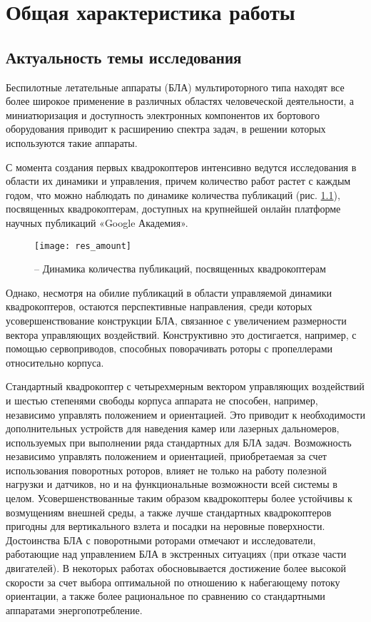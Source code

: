 
\chapter{Общая характеристика работы}

\section{Актуальность темы исследования}

Беспилотные летательные аппараты (БЛА) мультироторного типа находят все более широкое применение в различных областях человеческой деятельности, а миниатюризация и доступность электронных компонентов их бортового оборудования приводит к расширению спектра задач, в решении которых используются такие аппараты.

С момента создания первых квадрокоптеров интенсивно ведутся исследования в области их динамики и управления, причем количество работ растет с каждым годом, что можно наблюдать по динамике количества публикаций (рис. \ref{pic:res_amount}), посвященных квадрокоптерам, доступных на крупнейшей онлайн платформе научных публикаций «Google Академия».

\begin{figure}[h!]
	\centering
	\texttt{[image: res\_amount]}
	\caption{ -- Динамика количества публикаций, посвященных квадрокоптерам}
	\label{pic:res_amount}
\end{figure}

Однако, несмотря на обилие публикаций в области управляемой динамики квадрокоптеров, остаются перспективные направления, среди которых усовершенствование конструкции БЛА, связанное с увеличением размерности вектора управляющих воздействий.
Конструктивно это достигается, например, с помощью сервоприводов, способных поворачивать роторы с пропеллерами относительно корпуса.

Стандартный квадрокоптер с четырехмерным вектором управляющих воздействий и шестью степенями свободы корпуса аппарата не способен, например, независимо управлять положением и ориентацией.
Это приводит к необходимости дополнительных устройств для наведения камер или лазерных дальномеров, используемых при выполнении ряда стандартных для БЛА задач.
Возможность независимо управлять положением и ориентацией, приобретаемая за счет использования поворотных роторов, влияет не только на работу полезной нагрузки и датчиков, но и на функциональные возможности всей системы в целом.
Усовершенствованные таким образом квадрокоптеры более устойчивы к возмущениям внешней среды, а также лучше стандартных квадрокоптеров пригодны для вертикального взлета и посадки на неровные поверхности.
Достоинства БЛА с поворотными роторами отмечают и исследователи, работающие над управлением БЛА в экстренных ситуациях (при отказе части двигателей).
В некоторых работах обосновывается достижение более высокой скорости за счет выбора оптимальной по отношению к набегающему потоку ориентации, а также более рациональное по сравнению со стандартными аппаратами энергопотребление.

